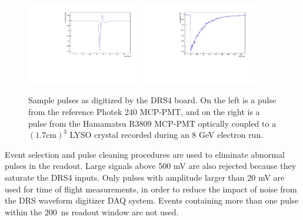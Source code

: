 \documentclass[12pt]{article}
\begin{document}
\begin{figure}[h] \centering
\includegraphics[width=0.45\textwidth]{figs/RefPulse} 
\includegraphics[width=0.45\textwidth]{figs/run064_event506} 
\caption{Sample pulses as digitized by the DRS4 board. 
On the left is a  pulse from the reference Photek 240 MCP-PMT, 
and on the right is a pulse from the Hamamatsu R3809 MCP-PMT
optically coupled to a $(1.7\mathrm{ cm})^3$ LYSO crystal 
recorded during an 8 GeV electron run.} 
\label{fig:PulseShapes}
\end{figure}

Event selection and pulse cleaning procedures are used to eliminate abnormal
pulses in the readout. Large signals above 500 mV are also rejected because they
saturate the DRS4 inputs. Only pulses with amplitude larger than 20 mV are used
for time of flight measurements, in order to reduce the impact of noise from the
DRS waveform digitizer DAQ system. Events containing more than one pulse within
the $200$~ns readout window are not used. 
\end{document}
